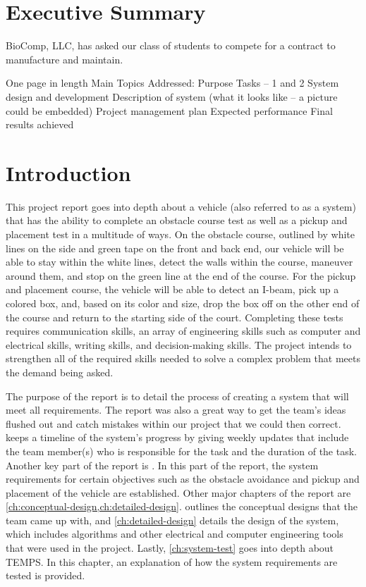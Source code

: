 \documentclass[11pt]{report}
\begin{document}
\chapter*{Executive Summary}
    BioComp, LLC, has asked our class of students to compete for a contract to manufacture and maintain.

One page in length
Main Topics Addressed:
Purpose
Tasks – 1 and 2
System design and development
Description of system (what it looks like – a picture could be embedded)
Project management plan
Expected performance
Final results achieved

\chapter{Introduction}\label{ch:introduction}

This project report goes into depth about a vehicle (also referred to as a system) that has the ability to complete an obstacle course test as well as a pickup and placement test in a multitude of ways. On the obstacle course, outlined by white lines on the side and green tape on the front and back end, our vehicle will be able to stay within the white lines, detect the walls within the course, maneuver around them, and stop on the green line at the end of the course. For the pickup and placement course, the vehicle will be able to detect an I-beam, pick up a colored box, and, based on its color and size, drop the box off on the other end of the course and return to the starting side of the court. Completing these tests requires communication skills, an array of engineering skills such as computer and electrical skills, writing skills, and decision-making skills. The project intends to strengthen all of the required skills needed to solve a complex problem that meets the demand being asked.
\par The purpose of the report is to detail the process of creating a system that will meet all requirements. The report was also a great way to get the team’s ideas flushed out and catch mistakes within our project that we could then correct.  keeps a timeline of the system’s progress by giving weekly updates that include the team member(s) who is responsible for the task and the duration of the task. Another key part of the report is .  In this part of the report, the system requirements for certain objectives such as the obstacle avoidance and pickup and placement of the vehicle are established. Other major chapters of the report are \cref{ch:conceptual-design,ch:detailed-design}.  outlines the conceptual designs that the team came up with, and \cref{ch:detailed-design} details the design of the system, which includes algorithms and other electrical and computer engineering tools that were used in the project. Lastly, \cref{ch:system-test} goes into depth about \gls{TEMPS}. In this chapter, an explanation of how the system requirements are tested is provided.
\end{document}
